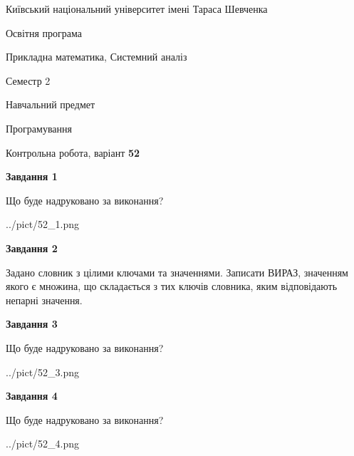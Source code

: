 \documentclass[12pt, ukrainian]{article}
\begin{document}
{{\begin {small}\par
{ \center  Київський національний університет імені Тараса Шевченка \par}
{\parbox {5 cm}{Освітня програма \hfill}{\parbox {8 cm}{Прикладна математика, Системний аналіз \hfill}}\parbox {5 cm}{\hfill Семестр 2}}\par
{\parbox {5 cm} {Навчальний предмет \hfill}\parbox {7 cm}{Програмування \hfill}\parbox {6cm}{\hfill}\par}\vspace{-7pt} \end{small}}{\center Контрольна робота, варіант  \No \textbf
{ 52 }\par}}
{
\begin {large}
{\begin {center}\textbf{Завдання 1}\end {center}}\par
Що буде надруковано за виконання?\par\par
\begin{center}
	{../pict/52_1.png}
\end{center}
\newpage

{\begin {center}\textbf{Завдання 2}\end {center}}\par
Задано словник  з цілими ключами та значеннями. Записати ВИРАЗ, значенням якого є множина, що складається  з тих ключів словника, яким відповідають непарні значення.\par
\newpage

{\begin {center}\textbf{Завдання 3}\end {center}}\par
Що буде надруковано за виконання?
\begin{center}
	{../pict/52_3.png}
\end{center}
\newpage

{\begin {center}\textbf{Завдання 4}\end {center}}\par
Що буде надруковано за виконання?\par
\begin{center}
	{../pict/52_4.png}
\end{center}
\newpage


\end{large}}
\end{document}
